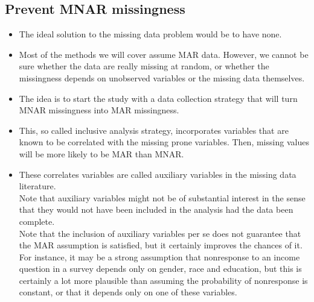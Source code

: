 \documentclass[11pt]{article}
\theoremstyle{break}
\begin{document}
\subsection{Prevent MNAR missingness}
\begin{itemize}
    \item The ideal solution to the missing data problem would be to have
none.
\item Most of the methods we will cover assume MAR data. However, we cannot be sure
whether the data are really missing at random, or whether the missingness depends on
unobserved variables or the missing data themselves.
\item The idea is to start the study with a data collection strategy that will turn MNAR
missingness into MAR missingness.
\item This, so called inclusive analysis strategy, incorporates variables that are known to be
correlated with the missing prone variables. Then, missing values will be more likely to be
MAR than MNAR.
\item These correlates variables are called auxiliary variables in the missing
    data literature. \\ Note that auxiliary variables might not be of substantial interest in the sense that they
would not have been included in the analysis had the data been complete. \\ Note that the inclusion of auxiliary variables per se does not guarantee that the MAR
assumption is satisfied, but it certainly improves the chances of it. \\ For instance, it may be a strong assumption that nonresponse to an income question in a
survey depends only on gender, race and education, but this is certainly a lot more
plausible than assuming the probability of nonresponse is constant, or that it depends only
on one of these variables.


\end{itemize}
\end{document}
